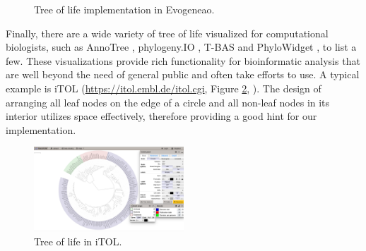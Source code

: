 \documentclass[11pt, a4paper,oneside,chapterprefix=false]{scrbook}
\begin{document}
\begin{figure}[h]
	\centering
	\hfill
	\caption{Tree of life implementation in Evogeneao. }
	\label{fig:evogeneao}
\end{figure}

Finally, there are a wide variety of tree of life visualized for computational biologists, such as AnnoTree \cite{mendler2019annotree}, phylogeny.IO \cite{jovanovic2019interactive}, T-BAS \cite{carbone2017t} and PhyloWidget \cite{jordan2008phylowidget}, to list a few. These visualizations provide rich functionality for bioinformatic analysis that are well beyond the need of general public and often take efforts to use. A typical example is iTOL (\url{https://itol.embl.de/itol.cgi}, Figure \ref{fig:iTOL}, \cite{letunic2019interactive}). The design of arranging all leaf nodes on the edge of a circle and all non-leaf  nodes in its interior utilizes space effectively, therefore providing a good hint for our implementation.\\

\begin{figure}[h]
	\centering
	\includegraphics[width=0.5\textwidth]{figures/related_work/iTOL}
	\caption{Tree of life in iTOL. }
	\label{fig:iTOL}
\end{figure}
\end{document}
